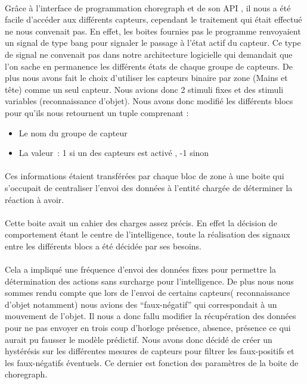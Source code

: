 
\paragraph{}
Grâce à l'interface de programmation choregraph et de son API , il nous a été
facile d'accéder aux différents capteurs, cependant le traitement qui était
effectué ne nous convenait pas. En effet, les boites fournies pas le programme
renvoyaient un signal de type bang pour signaler le passage à l'état actif du
capteur. Ce type de signal ne convenait pas dans notre architecture logicielle
qui demandait que l'on sache en permanence les différents états de chaque
groupe de capteurs. De plus nous avons fait le choix d'utiliser les capteurs
binaire par zone (Mains et tête) comme un seul capteur. Nous avions donc 2 stimuli fixes et
des stimuli variables (reconnaissance d'objet). Nous avons donc modifié les
différents blocs pour qu'ils nous retournent un tuple comprenant :
\begin{itemize}
  \item Le nom du groupe de capteur
  \item La valeur~: 1 si un des capteurs est activé , -1 sinon
\end{itemize}

\paragraph{}
Ces informations étaient transférées par chaque bloc de zone à une boite qui
s'occupait de centraliser l'envoi des données à l'entité chargée de déterminer la
réaction à avoir.

\paragraph{}
Cette boite avait un cahier des charges assez précis. En effet la décision de
comportement étant le centre de l'intelligence, toute la réalisation des signaux
entre les différents blocs a été décidée par ses besoins.

\paragraph{}
Cela a impliqué une fréquence d'envoi des données fixes pour permettre la
détermination des actions sans surcharge pour l'intelligence. De plus nous
nous sommes rendu compte que lors de l'envoi de certains capteurs(
reconnaissance d'objet notamment) nous avions des ``faux-négatif'' qui
correspondait à un mouvement de l'objet. Il nous a donc fallu modifier la
récupération des données pour ne pas envoyer en trois coup d'horloge
présence, absence, présence ce qui aurait pu fausser le modèle prédictif.
Nous avons donc décidé de créer un hystérésis sur les différentes mesures de
capteurs pour filtrer les faux-positifs et les faux-négatifs éventuels. Ce
dernier est fonction des paramètres de la boite de choregraph.

